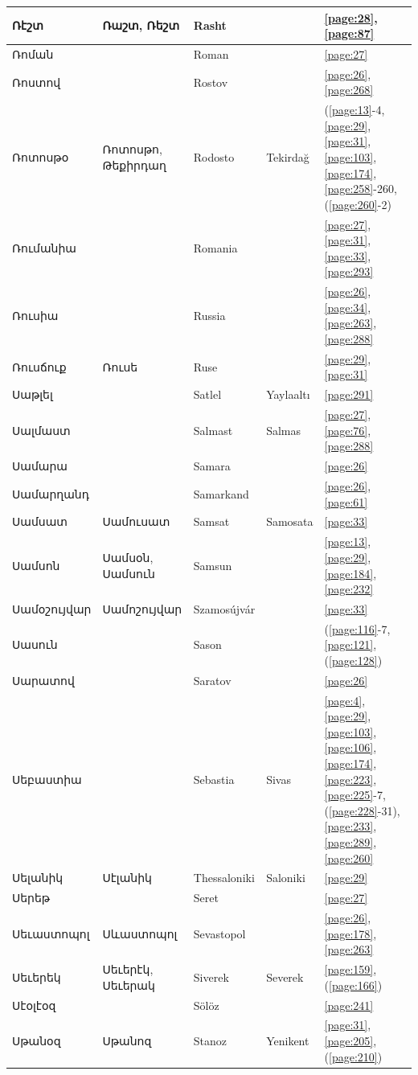 \begin{center}
\begin{longtable}{|p{}|p{3cm}|p{3cm}|p{2cm}|p{3cm}|}
Ռէշտ& Ռաշտ, Ռեշտ& Rasht& &\ref{page:28}, \ref{page:87}\\ \hline
Ռոման& & Roman& &\ref{page:27}\\ \hline
Ռոստով& & Rostov& &\ref{page:26}, \ref{page:268}\\ \hline
Ռոտոսթօ&Ռոտոսթո, Թեքիրդաղ& Rodosto&Tekirdağ &(\ref{page:13}-4, \ref{page:29}, \ref{page:31}, \ref{page:103}, \ref{page:174}, \ref{page:258}-260, (\ref{page:260}-2)\\ \hline
Ռումանիա& & Romania& &\ref{page:27}, \ref{page:31}, \ref{page:33}, \ref{page:293}\\ \hline
Ռուսիա& &Russia & &\ref{page:26}, \ref{page:34}, \ref{page:263}, \ref{page:288}\\ \hline
Ռուսճուք&Ռուսե & Ruse& &\ref{page:29}, \ref{page:31}\\ \hline
Սաթլել& & Satlel&Yaylaaltı &\ref{page:291}\\ \hline
Սալմաստ& &Salmast & Salmas&\ref{page:27}, \ref{page:76}, \ref{page:288}\\ \hline
Սամարա& &Samara & &\ref{page:26}\\ \hline
Սամարղանդ& &Samarkand & &\ref{page:26}, \ref{page:61}\\ \hline
Սամսատ& Սամուսատ& Samsat&Samosata &\ref{page:33}\\ \hline
Սամսոն& Սամսօն, Սամսուն& Samsun& &\ref{page:13}, \ref{page:29}, \ref{page:184}, \ref{page:232}\\ \hline
Սամօշույվար&Սամոշույվար &Szamosújvár &  &\ref{page:33}\\ \hline
Սասուն& & Sason& &(\ref{page:116}-7, \ref{page:121}, (\ref{page:128})\\ \hline
Սարատով& &Saratov & &\ref{page:26}\\ \hline
Սեբաստիա& & 
Sebastia&Sivas &\ref{page:4}, \ref{page:29}, \ref{page:103}, \ref{page:106}, \ref{page:174}, \ref{page:223}, \ref{page:225}-7, (\ref{page:228}-31), \ref{page:233}, \ref{page:289}, \ref{page:260}\\ \hline
Սելանիկ&Սէլանիկ &Thessaloniki &Saloniki &\ref{page:29}\\ \hline
Սերեթ& &Seret & &\ref{page:27}\\ \hline
Սեւաստոպոլ&Սևաստոպոլ &Sevastopol & &\ref{page:26}, \ref{page:178}, \ref{page:263}\\ \hline
Սեւերեկ&Սեւերէկ, Սեւերակ& Siverek&Severek &\ref{page:159}, (\ref{page:166})\\ \hline
Սէօլէօզ& &Sölöz & &\ref{page:241}\\ \hline
Սթանօզ& Սթանոզ& Stanoz &  Yenikent&\ref{page:31}, \ref{page:205}, (\ref{page:210})\\ \hline

\end{longtable}
\end{center}
